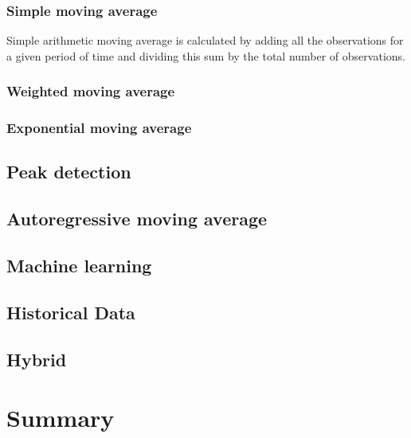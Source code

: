 		\subsubsection{Simple moving average}
		Simple arithmetic moving average is calculated by adding all the observations for a given period of time and dividing this sum by the total number of observations.
		\subsubsection{Weighted moving average}
		\subsubsection{Exponential moving average}
		\subsection{Peak detection}
		\subsection{Autoregressive moving average}
		
	\subsection{Machine learning}
	
	\subsection{Historical Data}
	
	\subsection{Hybrid}
	
\section{Summary}